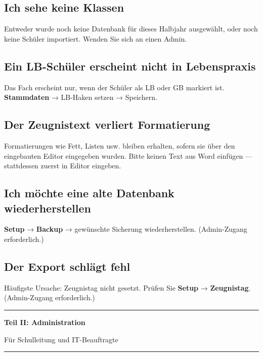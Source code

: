 \documentclass[12pt,a4paper]{article}
\newcommand{\menu}[1]{\textbf{\textcolor{primary}{#1}}}
\begin{document}
\subsection*{Ich sehe keine Klassen}
Entweder wurde noch keine Datenbank für dieses Halbjahr ausgewählt,
oder noch keine Schüler importiert. Wenden Sie sich an einen Admin.

\subsection*{Ein LB-Schüler erscheint nicht in Lebenspraxis}
Das Fach erscheint nur, wenn der Schüler als LB oder GB markiert ist.
\menu{Stammdaten} → LB-Haken setzen → Speichern.

\subsection*{Der Zeugnistext verliert Formatierung}
Formatierungen wie Fett, Listen usw. bleiben erhalten, sofern sie
über den eingebauten Editor eingegeben wurden.
Bitte keinen Text aus Word einfügen — stattdessen zuerst in Editor eingeben.

\subsection*{Ich möchte eine alte Datenbank wiederherstellen}
\menu{Setup} → \menu{Backup} → gewünschte Sicherung wiederherstellen.
(Admin-Zugang erforderlich.)

\subsection*{Der Export schlägt fehl}
Häufigste Ursache: Zeugnistag nicht gesetzt.
Prüfen Sie \menu{Setup} → \menu{Zeugnistag}. (Admin-Zugang erforderlich.)

\newpage

{%
  \centering
  \vspace{2em}
  {\color{adminborder}\rule{\linewidth}{2pt}}\par\vspace{0.5em}
  {\Large\bfseries\color{adminborder} Teil II: Administration}\par
  \vspace{0.3em}
  {\normalsize\color{gray} Für Schulleitung und IT-Beauftragte}\par
  \vspace{0.5em}
  {\color{adminborder}\rule{\linewidth}{2pt}}\par
  \vspace{2em}
}
\end{document}
